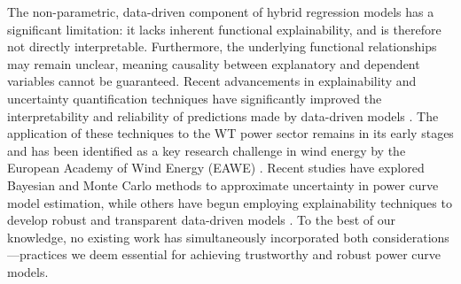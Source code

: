 \documentclass[preprint,12pt]{elsarticle}
\begin{document}
The non-parametric, data-driven component of hybrid regression models has a significant limitation: it lacks inherent functional explainability, and is therefore not directly interpretable. Furthermore, the underlying functional relationships may remain unclear, meaning causality between explanatory and dependent variables cannot be guaranteed. Recent advancements in explainability and uncertainty quantification techniques have significantly improved the interpretability and reliability of predictions made by data-driven models \cite{Linardatos2020,Abdar2021}. The application of these techniques to the WT power sector remains in its early stages and has been identified as a key research challenge in wind energy by the European Academy of Wind Energy (EAWE) \cite{Kuik2016}. Recent studies have explored Bayesian \cite{Aerts2023,Mclean2023} and Monte Carlo \cite{Richter2022} methods to approximate uncertainty in power curve model estimation, while others have begun employing explainability techniques to develop robust and transparent data-driven models \cite{CAKIROGLU2024,LIAO2024,LETZGUS2024}. To the best of our knowledge, no existing work has simultaneously incorporated both considerations—practices we deem essential for achieving trustworthy and robust power curve models.
\end{document}
